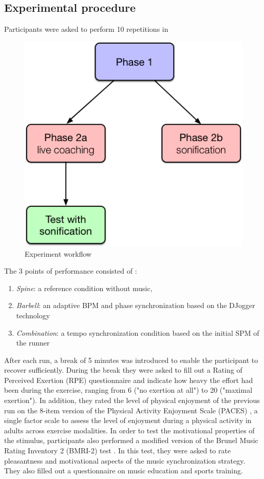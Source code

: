 \documentclass[10pt,letterpaper]{article}
\begin{document}
\subsection*{Experimental procedure}
Participants were asked to perform 10 repetitions in 


\begin{figure}[!h]
\center
\includegraphics[width=.8\textwidth]{figures/Experiment-flow.png}
\caption{Experiment workflow}
\label{fig:workflow}      
\end{figure}


The 3 points of performance consisted of :
\begin{enumerate} %
\item  \emph{Spine}: a reference condition without music, 
\item  \emph{Barbell}: an adaptive BPM and phase synchronization based on the DJogger technology \cite{moens2014encouraging}
\item  \emph{Combination}: a tempo synchronization condition based on the initial SPM of the runner
\end{enumerate}



After each run, a break of 5 minutes was introduced to enable the participant to recover sufficiently. During the break they were asked to fill out a Rating of Perceived Exertion (RPE) questionnaire \cite{borg1998borg} and indicate how heavy the effort had been during the exercise, ranging from 6 ("no exertion at all") to 20 ("maximal exertion"). In addition, they rated the level of physical enjoyment of the previous run on the 8-item version of the Physical Activity Enjoyment Scale (PACES) \cite{kendzierski1991physical}, a single factor scale to assess the level of enjoyment during a physical activity in adults across exercise modalities.
In order to test the motivational properties of the stimulus, participants also performed a modified version of the Brunel Music Rating Inventory 2 (BMRI-2) test \cite{karageorghis2006redesign}. In this test, they were asked to rate pleasantness and motivational aspects of the music synchronization strategy. They also filled out a questionnaire on music education and sports training. 
\end{document}
